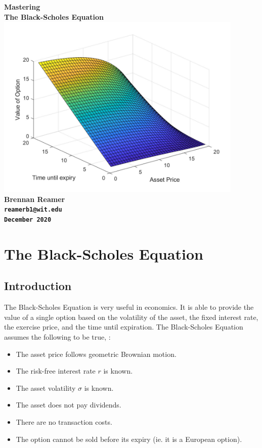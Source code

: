 \documentclass{article}
\begin{document}
\begin{titlepage}
  \begin{center}
    \bfseries
\huge Mastering \\ The Black-Scholes Equation \\[.5in]
\vfill
\includegraphics[height=3.5in]{BlackScholes3D}
\vfill
\LARGE Brennan Reamer \\[.2in]
\texttt{reamerb1@wit.edu}\\
\texttt{December 2020}
\end{center}      
\end{titlepage}
\newpage
\section{The Black-Scholes Equation}
\subsection{Introduction}
The Black-Scholes Equation is very useful in economics. It is able to provide the value of a single option based on the volatility of the asset, the fixed interest rate, the exercise price, and the time until expiration. The Black-Scholes Equation assumes the following to be true, \cite{notes}:
\begin{itemize}
\item{The asset price follows geometric Brownian motion.}
\item{The risk-free interest rate $r$ is known.}
\item{The asset volatility $\sigma$ is known.}
\item{The asset does not pay dividends.}
\item{There are no transaction costs.}
\item{The option cannot be sold before its expiry (ie. it is a European option).}
\end{itemize}
\end{document}
